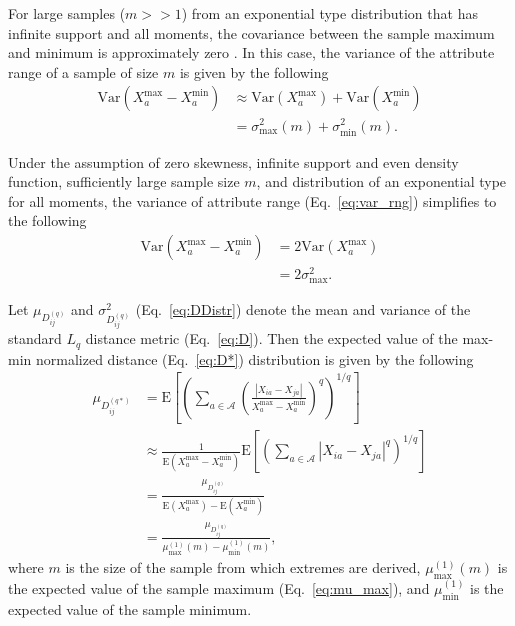 \documentclass[10pt,letterpaper]{article}
\begin{document}
For large samples ($m >> 1$) from an exponential type distribution that has infinite support and all moments, the covariance between the sample maximum and minimum is approximately zero \cite{gumbel1947}. In this case, the variance of the attribute range of a sample of size $m$ is given by the following
%
\begin{equation}\label{eq:var_rng}
\begin{aligned}
\text{Var}(X^\text{max}_a - X^\text{min}_a) &\approx \text{Var}(X^\text{max}_a) + \text{Var}(X^\text{min}_a) \\
&= \sigma^2_\text{max}(m) + \sigma^2_\text{min}(m).
\end{aligned}
\end{equation}

Under the assumption of zero skewness, infinite support and even density function, sufficiently large sample size $m$, and distribution of an exponential type for all moments, the variance of attribute range (Eq.~\ref{eq:var_rng}) simplifies to the following
%
\begin{equation}\label{eq:var_rng_symm}
\begin{aligned}
\text{Var}(X^\text{max}_a - X^\text{min}_a) &= 2 \text{Var}(X^\text{max}_a) \\
&= 2 \sigma^2_\text{max}.
\end{aligned}
\end{equation} 

Let $\mu_{D^{(q)}_{ij}}$ and $\sigma^2_{D^{(q)}_{ij}}$ (Eq.~\ref{eq:DDistr}) denote the mean and variance of the standard $L_q$ distance metric (Eq.~\ref{eq:D}). Then the expected value of the max-min normalized distance (Eq.~\ref{eq:D*}) distribution is given by the following
%
\begin{equation}\label{eq:max-min_D_mean}
\begin{aligned}
\mu_{D^{(q*)}_{ij}} &= \text{E}\left[\left(\sum_{a \in \mathcal{A}}\left(\frac{|X_{ia} - X_{ja}|}{X^\text{max}_a - X^\text{min}_a}\right)^q\right)^{1/q}\right] \\
&\approx \frac{1}{\text{E}(X^\text{max}_a - X^\text{min}_a)}\text{E}\left[\left(\sum_{a \in \mathcal{A}}|X_{ia} - X_{ja}|^q\right)^{1/q}\right] \\
&= \frac{\mu_{D^{(q)}_{ij}}}{\text{E}(X^\text{max}_a) - \text{E}(X^\text{min}_a)} \\
&= \frac{\mu_{D^{(q)}_{ij}}}{\mu^{(1)}_\text{max}(m) - \mu^{(1)}_\text{min}(m)},
\end{aligned}
\end{equation}
%
where $m$ is the size of the sample from which extremes are derived, $\mu^{(1)}_\text{max}(m)$ is the expected value of the sample maximum (Eq.~\ref{eq:mu_max}), and $\mu^{(1)}_\text{min}$ is the expected value of the sample minimum. 
\end{document}
